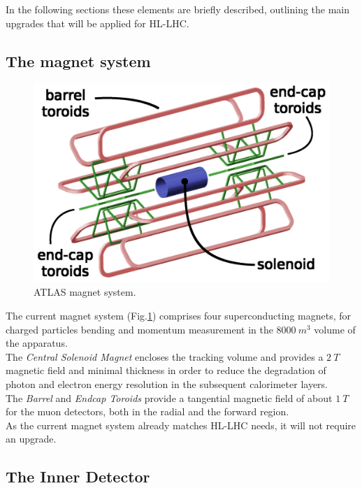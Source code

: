 \documentclass[a4paper,twoside,12pt]{article}
\begin{document}
In the following sections these elements are briefly described, outlining the main upgrades that will be applied for HL-LHC. 

\subsection{The magnet system}\label{sec:magnet}

\begin{figure} [h]
	\centering
	\includegraphics[scale=0.13]{magnetSystems}
	\caption{ATLAS magnet system\cite{magnet_system_picture}.}
	\label{fig:magnet_system_picture}
\end{figure}

The current magnet system (Fig.\ref{fig:magnet_system_picture}) comprises four superconducting magnets\cite{magnet_system}, for charged particles bending and momentum measurement in the $8000\ m^3$ volume of the apparatus.\\

The \textit{Central Solenoid Magnet} encloses the tracking volume and provides a $2\ T$ magnetic field and minimal thickness in order to reduce the degradation of photon and electron energy resolution in the subsequent calorimeter layers.\\

The \textit{Barrel} and \textit{Endcap Toroids} provide a tangential magnetic field of about $1\ T$ for the muon detectors, both in the radial and the forward region.\\

As the current magnet system already matches HL-LHC needs, it will not require an
upgrade.

\subsection{The Inner Detector}
\end{document}
